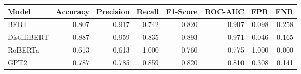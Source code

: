 \begin{tabular}{|l||r|r|r|r|r|r|r|}
\toprule
Model & \textbf{Accuracy} & \textbf{Precision} & Recall & \textbf{F1-Score} & \textbf{ROC-AUC} & \textbf{FPR} & FNR \\
\midrule \midrule
BERT & 0.807 & 0.917 & 0.742 & 0.820 & 0.907 & 0.098 & 0.258 \\
DistilliBERT & 0.887 & 0.959 & 0.835 & 0.893 & 0.971 & 0.046 & 0.165 \\
RoBERTa & 0.613 & 0.613 & 1.000 & 0.760 & 0.775 & 1.000 & 0.000 \\
GPT2 & 0.787 & 0.785 & 0.859 & 0.820 & 0.810 & 0.308 & 0.141 \\
\bottomrule
\end{tabular}

